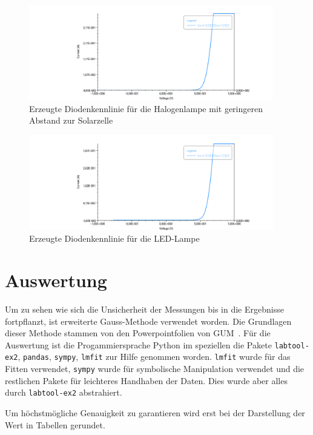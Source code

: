 \documentclass[12pt,english,ngerman]{scrartcl}
\begin{document}
\begin{figure}[H]
	\centering
	\includegraphics[width=0.95\textwidth]{figures/helllampe2.png}
	\caption{Erzeugte Diodenkennlinie für die Halogenlampe mit geringeren Abstand zur Solarzelle}\label{fig:mess_hellkennlinie_lampe2}
\end{figure}

\begin{figure}[H]
	\centering
	\includegraphics[width=0.95\textwidth]{figures/hellled.png}
	\caption{Erzeugte Diodenkennlinie für die LED-Lampe}\label{fig:mess_hellkennlinie_led}
\end{figure}

\section{Auswertung}\label{sec:auswertung}

Um zu sehen wie sich die Unsicherheit der Messungen bis in die Ergebnisse
fortpflanzt, ist erweiterte Gauss-Methode verwendet worden. Die Grundlagen
dieser Methode stammen von den Powerpointfolien von
GUM~\cite{wolfgang_kessel_isobipm-gum_2004}. Für die Auswertung ist die
Progammiersprache Python im speziellen die Pakete \verb#labtool-ex2#,
\verb#pandas#, \verb#sympy#, \verb#lmfit# zur Hilfe genommen worden.
\verb#lmfit# wurde für das Fitten verwendet, \verb#sympy# wurde für symbolische
Manipulation verwendet und die restlichen Pakete für leichteres Handhaben der
Daten. Dies wurde aber alles durch \verb#labtool-ex2# abstrahiert.

Um höchstmögliche Genauigkeit zu garantieren wird erst bei der Darstellung der
Wert in Tabellen gerundet.
\end{document}
